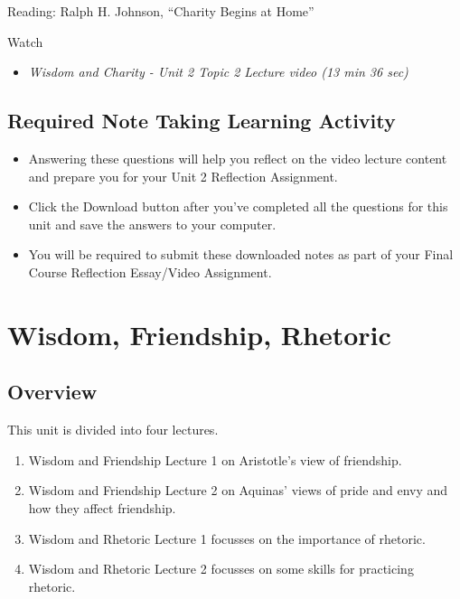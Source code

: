 \documentclass[
]{book}
\providecommand{\tightlist}{%
  \setlength{\itemsep}{0pt}\setlength{\parskip}{0pt}}
\begin{document}
Reading: Ralph H. Johnson, ``Charity Begins at Home''

Watch

\begin{itemize}
\tightlist
\item
  \emph{Wisdom and Charity - Unit 2 Topic 2 Lecture video (13 min 36 sec)}
\end{itemize}

\hypertarget{required-note-taking-learning-activity-1}{%
\section*{Required Note Taking Learning Activity}\label{required-note-taking-learning-activity-1}}

\begin{itemize}
\tightlist
\item
  Answering these questions will help you reflect on the video lecture content and prepare you for your Unit 2 Reflection Assignment.
\item
  Click the Download button after you've completed all the questions for this unit and save the answers to your computer.
\item
  You will be required to submit these downloaded notes as part of your Final Course Reflection Essay/Video Assignment.
\end{itemize}

\hypertarget{wisdom-friendship-rhetoric}{%
\chapter{Wisdom, Friendship, Rhetoric}\label{wisdom-friendship-rhetoric}}

\hypertarget{overview-2}{%
\section*{Overview}\label{overview-2}}

This unit is divided into four lectures.

\begin{enumerate}
\def\labelenumi{\arabic{enumi}.}
\tightlist
\item
  Wisdom and Friendship Lecture 1 on Aristotle's view of friendship.
\item
  Wisdom and Friendship Lecture 2 on Aquinas' views of pride and envy and how they affect friendship.
\item
  Wisdom and Rhetoric Lecture 1 focusses on the importance of rhetoric.
\item
  Wisdom and Rhetoric Lecture 2 focusses on some skills for practicing rhetoric.
\end{enumerate}
\end{document}

